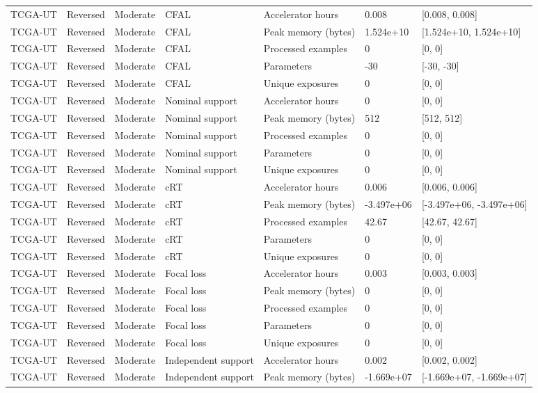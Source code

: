 \begin{longtable}{lllllll}
TCGA-UT & Reversed & Moderate & CFAL & Accelerator hours & 0.008 & [0.008, 0.008] \\
TCGA-UT & Reversed & Moderate & CFAL & Peak memory (bytes) & 1.524e+10 & [1.524e+10, 1.524e+10] \\
TCGA-UT & Reversed & Moderate & CFAL & Processed examples & 0 & [0, 0] \\
TCGA-UT & Reversed & Moderate & CFAL & Parameters & -30 & [-30, -30] \\
TCGA-UT & Reversed & Moderate & CFAL & Unique exposures & 0 & [0, 0] \\
TCGA-UT & Reversed & Moderate & Nominal support & Accelerator hours & 0 & [0, 0] \\
TCGA-UT & Reversed & Moderate & Nominal support & Peak memory (bytes) & 512 & [512, 512] \\
TCGA-UT & Reversed & Moderate & Nominal support & Processed examples & 0 & [0, 0] \\
TCGA-UT & Reversed & Moderate & Nominal support & Parameters & 0 & [0, 0] \\
TCGA-UT & Reversed & Moderate & Nominal support & Unique exposures & 0 & [0, 0] \\
TCGA-UT & Reversed & Moderate & cRT & Accelerator hours & 0.006 & [0.006, 0.006] \\
TCGA-UT & Reversed & Moderate & cRT & Peak memory (bytes) & -3.497e+06 & [-3.497e+06, -3.497e+06] \\
TCGA-UT & Reversed & Moderate & cRT & Processed examples & 42.67 & [42.67, 42.67] \\
TCGA-UT & Reversed & Moderate & cRT & Parameters & 0 & [0, 0] \\
TCGA-UT & Reversed & Moderate & cRT & Unique exposures & 0 & [0, 0] \\
TCGA-UT & Reversed & Moderate & Focal loss & Accelerator hours & 0.003 & [0.003, 0.003] \\
TCGA-UT & Reversed & Moderate & Focal loss & Peak memory (bytes) & 0 & [0, 0] \\
TCGA-UT & Reversed & Moderate & Focal loss & Processed examples & 0 & [0, 0] \\
TCGA-UT & Reversed & Moderate & Focal loss & Parameters & 0 & [0, 0] \\
TCGA-UT & Reversed & Moderate & Focal loss & Unique exposures & 0 & [0, 0] \\
TCGA-UT & Reversed & Moderate & Independent support & Accelerator hours & 0.002 & [0.002, 0.002] \\
TCGA-UT & Reversed & Moderate & Independent support & Peak memory (bytes) & -1.669e+07 & [-1.669e+07, -1.669e+07] \\

\end{longtable}
